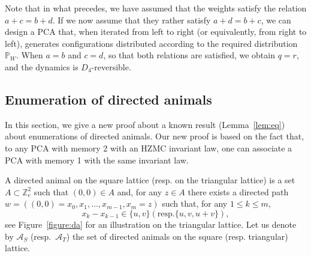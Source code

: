 \documentclass[10pt]{amsart}
\theoremstyle{definition}\newtheorem{defi}[theo]{Definition}\newtheorem{rema}[theo]{Remark}\newtheorem{exam}[theo]{Example}\newtheorem{exem}[theo]{Example}\newtheorem{nota}[theo]{Notation}
\newcounter{a}
\newcommand{\Z}{\mathbb{Z}}
\begin{document}
Note that in what precedes, we have assumed that the weights satisfy the relation $a+c=b+d$. If we now assume that they rather satisfy $a+d=b+c$, we can design a PCA that, when iterated from left to right (or equivalently, from right to left), generates configurations distributed according to the required distribution ${\mathbb P}_W$. When $a=b$ and $c=d$, so that both relations are satisfied, we obtain $q=r$, and the dynamics is $D_4$-reversible.

\subsection{Enumeration of directed animals} \label{sec:animals}
In this section, we give a new proof about a known result (Lemma~\ref{lem:eq}) about enumerations of directed animals. Our new proof is based on the fact that, to any PCA with memory 2 with an HZMC invariant law, one can associate a PCA with memory 1 with the same invariant law.

A directed animal on the square lattice (resp. on the triangular lattice) is a set $A \subset \Z_{e}^2$ such that $(0,0) \in A$ and, for any $z \in A$ there exists a directed path $w=((0,0) = x_0, x_1, \dots, x_{m-1}, x_m=z)$ such that, for any $1 \leq k \leq m$,
\[
x_k-x_{k-1} \in \{u,v\} (\text{resp.}\{u,v,u+v\}),
\]
see Figure~\ref{figure:da} for an illustration on the triangular lattice. Let us denote by $\mathcal{A}_S$ (resp.~$\mathcal{A}_T$) the set of directed animals on the square (resp. triangular) lattice.
\end{document}
